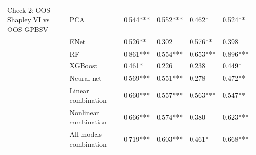 \begin{tabular}{llllll}
Check 2: OOS Shapley VI vs OOS GPBSV & PCA &  0.544*** &  0.552*** &    0.462* &   0.524** \\
                                     & ENet &   0.526** &     0.302 &   0.576** &     0.398 \\
                                     & RF &  0.861*** &  0.554*** &  0.653*** &  0.896*** \\
                                     & XGBoost &    0.461* &     0.226 &     0.238 &    0.449* \\
                                     & Neural net &  0.569*** &  0.551*** &     0.278 &   0.472** \\
                                     & Linear combination &  0.660*** &  0.557*** &  0.563*** &   0.547** \\
                                     & Nonlinear combination &  0.666*** &  0.574*** &     0.380 &  0.623*** \\
                                     & All models combination &  0.719*** &  0.603*** &    0.461* &  0.668*** \\
\bottomrule
\end{tabular}
